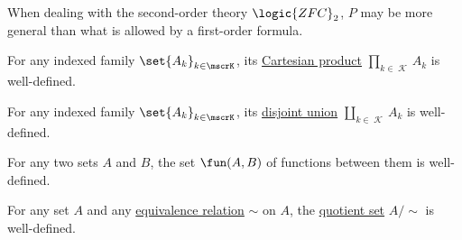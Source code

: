 \begin{proposition}
\begin{thmenum}
    When dealing with the second-order theory \( \logic{ZFC}_2 \), \( P \) may be more general than what is allowed by a first-order formula.

     For any indexed family \( \set{ A_k }_{k \in \mscrK} \), its \hyperref[def:cartesian_product]{Cartesian product} \( \prod_{k \in \mscrK} A_k \) is well-defined.

     For any indexed family \( \set{ A_k }_{k \in \mscrK} \), its \hyperref[def:disjoint_union]{disjoint union} \( \coprod_{k \in \mscrK} A_k \) is well-defined.

     For any two sets \( A \) and \( B \), the set \hyperref[def:set_of_all_functions]{\( \fun(A, B) \)} of functions between them is well-defined.

     For any set \( A \) and any \hyperref[def:equivalence_relation]{equivalence relation} \( {\sim} \) on \( A \), the \hyperref[def:equivalence_relation/quotient]{quotient set} \( A / {\sim} \) is well-defined.
  \end{thmenum}
\end{proposition}
